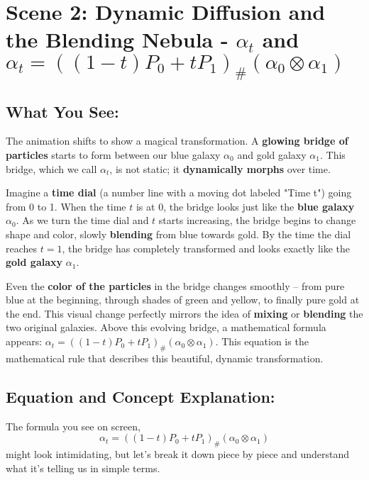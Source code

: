 \documentclass{article}
\begin{document}
\hrulefill

\section*{Scene 2: Dynamic Diffusion and the Blending Nebula - \( \alpha_t \) and \( \alpha_t = ((1 - t)P_0 + tP_1)_{\#} (\alpha_0 \otimes \alpha_1) \)}

\subsection*{What You See:}

The animation shifts to show a magical transformation. A \textbf{glowing bridge of particles} starts to form between our blue galaxy \( \alpha_0 \) and gold galaxy \( \alpha_1 \). This bridge, which we call \textbf{\( \alpha_t \)}, is not static; it \textbf{dynamically morphs} over time.

Imagine a \textbf{time dial} (a number line with a moving dot labeled "Time t") going from 0 to 1.  When the time \( t \) is at 0, the bridge looks just like the \textbf{blue galaxy} \( \alpha_0 \). As we turn the time dial and \( t \) starts increasing, the bridge begins to change shape and color, slowly \textbf{blending} from blue towards gold. By the time the dial reaches \( t=1 \), the bridge has completely transformed and looks exactly like the \textbf{gold galaxy} \( \alpha_1 \).

Even the \textbf{color of the particles} in the bridge changes smoothly – from pure blue at the beginning, through shades of green and yellow, to finally pure gold at the end. This visual change perfectly mirrors the idea of \textbf{mixing} or \textbf{blending} the two original galaxies. Above this evolving bridge, a mathematical formula appears: \( \alpha_t = ((1 - t)P_0 + tP_1)_{\#} (\alpha_0 \otimes \alpha_1) \).  This equation is the mathematical rule that describes this beautiful, dynamic transformation.

\subsection*{Equation and Concept Explanation: }

The formula you see on screen,
\[
\alpha_t = ((1 - t)P_0 + tP_1)_{\#} (\alpha_0 \otimes \alpha_1)
\]
might look intimidating, but let's break it down piece by piece and understand what it's telling us in simple terms.
\end{document}
